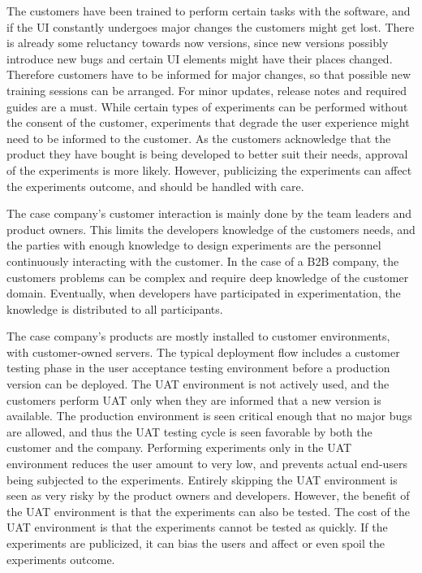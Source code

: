 \documentclass[english]{tktltiki2}
\theoremstyle{definition}
\theoremstyle{remark}
\begin{document}
The customers have been trained to perform certain tasks with the software, and if the UI constantly undergoes major changes the customers might get lost. There is already some reluctancy towards now versions, since new versions possibly introduce new bugs and certain UI elements might have their places changed. Therefore customers have to be informed for major changes, so that possible new training sessions can be arranged. For minor updates, release notes and required guides are a must. While certain types of experiments can be performed without the consent of the customer, experiments that degrade the user experience might need to be informed to the customer. As the customers acknowledge that the product they have bought is being developed to better suit their needs, approval of the experiments is more likely. However, publicizing the experiments can affect the experiments outcome, and should be handled with care.

The case company's customer interaction is mainly done by the team leaders and product owners. This limits the developers knowledge of the customers needs, and the parties with enough knowledge to design experiments are the personnel continuously interacting with the customer. In the case of a B2B company, the customers problems can be complex and require deep knowledge of the customer domain. Eventually, when developers have participated in experimentation, the knowledge is distributed to all participants.

The case company's products are mostly installed to customer environments, with customer-owned servers. The typical deployment flow includes a customer testing phase in the user acceptance testing environment before a production version can be deployed. The UAT environment is not actively used, and the customers perform UAT only when they are informed that a new version is available. The production environment is seen critical enough that no major bugs are allowed, and thus the UAT testing cycle is seen favorable by both the customer and the company. Performing experiments only in the UAT environment reduces the user amount to very low, and prevents actual end-users being subjected to the experiments. Entirely skipping the UAT environment is seen as very risky by the product owners and developers. However, the benefit of the UAT environment is that the experiments can also be tested. The cost of the UAT environment is that the experiments cannot be tested as quickly. If the experiments are publicized, it can bias the users and affect or even spoil the experiments outcome.  
\end{document}
